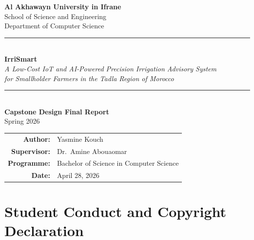 \documentclass[12pt,a4paper]{report}
\begin{document}

\begin{titlepage}
\centering
\vspace*{1.5cm}

{\Large\bfseries\color{auiblue} Al Akhawayn University in Ifrane}\\[0.3cm]
{\large School of Science and Engineering}\\[0.2cm]
{\large Department of Computer Science}\\[2cm]

\rule{\linewidth}{1.5pt}\\[0.4cm]
{\Huge\bfseries\color{auiblue} IrriSmart}\\[0.5cm]
{\large\itshape A Low-Cost IoT and AI-Powered Precision Irrigation Advisory System\\
for Smallholder Farmers in the Tadla Region of Morocco}\\[0.4cm]
\rule{\linewidth}{1.5pt}\\[2cm]

{\large\bfseries Capstone Design Final Report}\\[0.3cm]
{\large Spring 2026}\\[2.5cm]

\begin{tabular}{rl}
  \textbf{Author:}     & Yasmine Kouch \\[0.4cm]
  \textbf{Supervisor:} & Dr.\ Amine Abouaomar \\[0.4cm]
  \textbf{Programme:}  & Bachelor of Science in Computer Science \\[0.4cm]
  \textbf{Date:}       & April 28, 2026 \\
\end{tabular}

\vfill
\end{titlepage}

\chapter*{Student Conduct and Copyright Declaration}
\thispagestyle{fancy}
\end{document}
